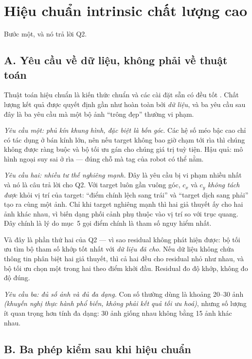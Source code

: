 \documentclass[../../marker.tex]{subfiles}
\begin{document}
\section{Hiệu chuẩn intrinsic chất lượng cao}

Bước một, và nó trả lời Q2.

\subsection{A. Yêu cầu về dữ liệu, không phải về thuật toán}

Thuật toán hiệu chuẩn là kiến thức chuẩn và các cài đặt sẵn có đều tốt \cite{zhang2000flexible}. Chất lượng kết quả được quyết định gần như hoàn toàn bởi \emph{dữ liệu}, và ba yêu cầu sau đây là ba yêu cầu mà một bộ ảnh ``trông đẹp'' thường vi phạm.

\emph{Yêu cầu một: phủ kín khung hình, đặc biệt là bốn góc.} Các hệ số méo bậc cao chỉ có tác dụng ở bán kính lớn, nên nếu target không bao giờ chạm tới rìa thì chúng không được ràng buộc và bộ tối ưu gán cho chúng giá trị tuỳ tiện. Hậu quả: mô hình ngoại suy sai ở rìa --- đúng chỗ mà tag của robot có thể nằm.

\emph{Yêu cầu hai: nhiều tư thế nghiêng mạnh.} Đây là yêu cầu bị vi phạm nhiều nhất và nó là câu trả lời cho Q2. Với target luôn gần vuông góc, \(c_x\) và \(c_y\) \emph{không tách được} khỏi vị trí của target: ``điểm chính lệch sang trái'' và ``target dịch sang phải'' tạo ra cùng một ảnh. Chỉ khi target nghiêng mạnh thì hai giả thuyết ấy cho hai ảnh khác nhau, vì biến dạng phối cảnh phụ thuộc vào vị trí so với trục quang. Đây chính là lý do  mục~5 gọi điểm chính là tham số nguy hiểm nhất.

Và đây là phần thứ hai của Q2 --- vì sao residual không phát hiện được: bộ tối ưu tìm bộ tham số khớp tốt nhất với \emph{dữ liệu đã cho}. Nếu dữ liệu không chứa thông tin phân biệt hai giả thuyết, thì cả hai đều cho residual nhỏ như nhau, và bộ tối ưu chọn một trong hai theo điểm khởi đầu. Residual đo độ khớp, không đo độ đúng.

\emph{Yêu cầu ba: đủ số ảnh và đủ đa dạng.} Con số thường dùng là khoảng 20--30 ảnh \emph{(khuyến nghị thực hành phổ biến, không phải kết quả tối ưu hoá)}, nhưng số lượng ít quan trọng hơn tính đa dạng: 30 ảnh giống nhau không bằng 15 ảnh khác nhau.

\subsection{B. Ba phép kiểm sau khi hiệu chuẩn}
\end{document}
